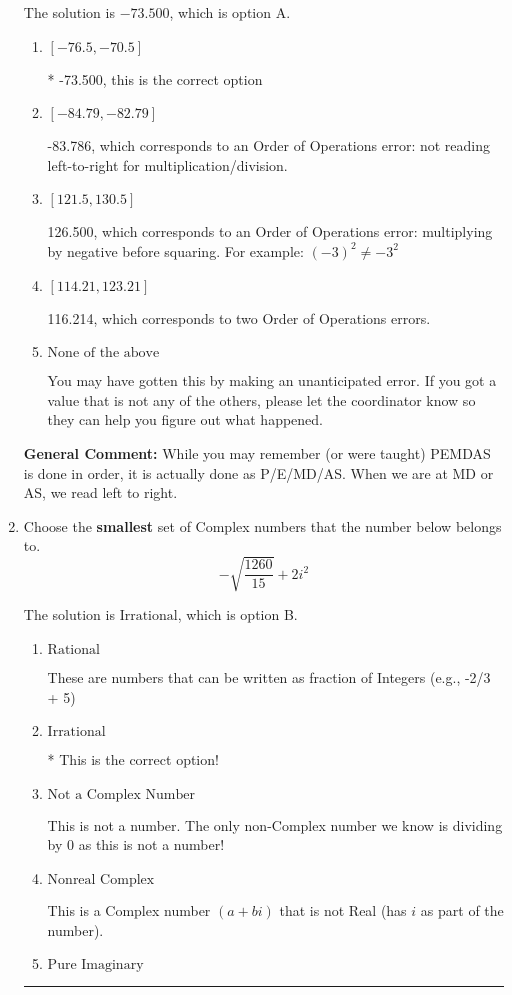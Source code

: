 \documentclass{extbook}[14pt]
\newcommand{\litem}[1]{\item #1

\rule{\textwidth}{0.4pt}}
\begin{document}
\begin{enumerate}
{The solution is \( -73.500 \), which is option A.\begin{enumerate}[label=\Alph*.]
\item \( [-76.5, -70.5] \)

* -73.500, this is the correct option
\item \( [-84.79, -82.79] \)

 -83.786, which corresponds to an Order of Operations error: not reading left-to-right for multiplication/division.
\item \( [121.5, 130.5] \)

 126.500, which corresponds to an Order of Operations error: multiplying by negative before squaring. For example: $(-3)^2 \neq -3^2$
\item \( [114.21, 123.21] \)

 116.214, which corresponds to two Order of Operations errors.
\item \( \text{None of the above} \)

 You may have gotten this by making an unanticipated error. If you got a value that is not any of the others, please let the coordinator know so they can help you figure out what happened.
\end{enumerate}

\textbf{General Comment:} While you may remember (or were taught) PEMDAS is done in order, it is actually done as P/E/MD/AS. When we are at MD or AS, we read left to right.
}
\litem{
Choose the \textbf{smallest} set of Complex numbers that the number below belongs to.
\[ -\sqrt{\frac{1260}{15}}+2i^2 \]

The solution is \( \text{Irrational} \), which is option B.\begin{enumerate}[label=\Alph*.]
\item \( \text{Rational} \)

These are numbers that can be written as fraction of Integers (e.g., -2/3 + 5)
\item \( \text{Irrational} \)

* This is the correct option!
\item \( \text{Not a Complex Number} \)

This is not a number. The only non-Complex number we know is dividing by 0 as this is not a number!
\item \( \text{Nonreal Complex} \)

This is a Complex number $(a+bi)$ that is not Real (has $i$ as part of the number).
\item \( \text{Pure Imaginary} \)


\end{enumerate}}
\end{enumerate}
\end{document}
